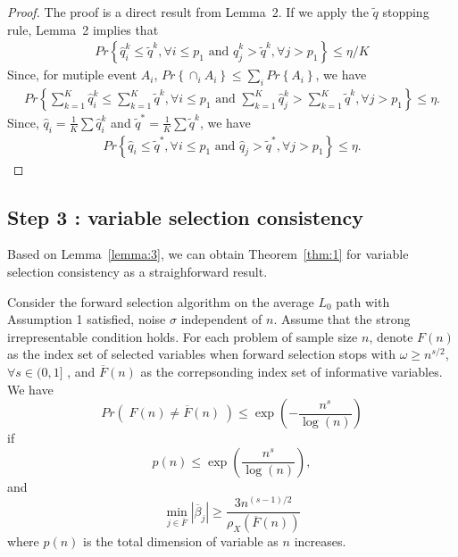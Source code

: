 \documentclass[11pt,review,authoryear]{elsarticle}
\begin{document}
\begin{appendices}
\begin{proof}
    The proof is a direct result from Lemma~2. If we apply the $\widetilde{q}$ stopping rule, Lemma~2 implies that 
    \begin{eqnarray}
        Pr\left\{ \widehat{q}_i^k \leqslant \widetilde{q}^k,\forall i\leqslant p_1 \mbox{ and } \widehat{q}_j^k > \widetilde{q}^k,\forall j>p_1 \right\} \leqslant \eta/K
    \end{eqnarray}
    Since, for mutiple event $A_i$, $Pr\left\{ \cap_i A_i\right\} \leqslant \sum_i Pr\left\{ A_i\right\}$, we have 
    \begin{eqnarray}
        Pr\left\{ \sum_{k=1}^K \widehat{q}_i^k \leqslant \sum_{k=1}^K \widetilde{q}^k,\forall i\leqslant p_1 \mbox{ and } \sum_{k=1}^K  \widehat{q}_j^k > \sum_{k=1}^K \widetilde{q}^k,\forall j>p_1 \right\} \leqslant \eta.
    \end{eqnarray}
    Since, $\widehat{q}_i = \frac{1}{K}\sum\widehat{q}_{i}^{k}$ and $\widetilde{q}^* = \frac{1}{K}\sum\widetilde{q}^k$, we have 
    \begin{eqnarray}
        Pr\left\{ \widehat{q}_i \leqslant \widetilde{q}^*,\forall i \leqslant p_1 \mbox{ and } \widehat{q}_j > \widetilde{q}^*,\forall j>p_1 \right\} \leqslant \eta.
    \end{eqnarray}
\end{proof}


\subsection*{Step 3 : variable selection consistency}

Based on Lemma~\ref{lemma:3}, we can obtain Theorem~\ref{thm:1} for variable selection consistency as a straighforward result.

\begin{theorem}
  Consider the forward selection algorithm on the average $L_0$ path with Assumption 1 satisfied, noise $\sigma$ independent of $n$. Assume that the strong irrepresentable condition holds. For each problem of sample size $n$, denote $F\left( n \right)$ as the index set of selected variables when forward selection stops with $\omega\geqslant n^{s/2}$, $\forall s\in(0,1]$ , and $\overline{F}\left(n\right)$ as the correpsonding index set of informative variables. We have 
  \[
      Pr\left(\;F\left(n\right)\neq\overline{F}\left(n\right)\;\right)\leqslant \exp\left(-\frac{n^{s}}{\log\left(n\right)}\right)
  \]
  if
  \[
      p\left(n\right)\leqslant\exp\left(\frac{n^{s}}{\log\left(n\right)}\right),
  \]
  and 
  \[
      \min_{j\in\overline{F}}\left|\overline{\beta}_{j}\right|\geqslant\frac{3n^{(s-1)/2}}{\rho_{X}\left(\overline{F}\left(n\right)\right)}
  \]
  where $p\left(n\right)$ is the total dimension of variable as $n$ increases.
  \label{thm:1}
\end{theorem}


\end{appendices}
\end{document}
